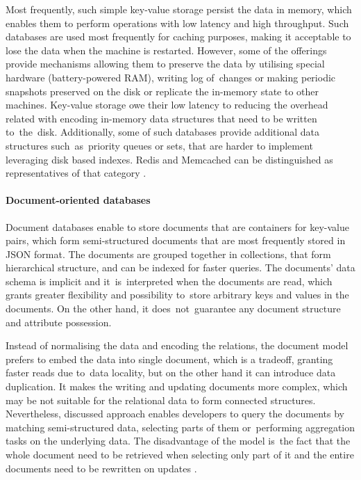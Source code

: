 Most frequently, such simple key-value storage persist the data in memory, which enables them to perform operations with low latency and high throughput. Such databases are used most frequently for caching purposes, making it acceptable to lose the data when the machine is restarted. However, some of the offerings provide mechanisms allowing them to preserve the data by utilising special hardware (battery-powered RAM), writing log of~changes or making periodic snapshots preserved on the disk or replicate the in-memory state to other machines. Key-value storage owe their low latency to reducing the overhead related with encoding in-memory data structures that need to be written to~the~disk. Additionally, some of such databases provide additional data structures such~as~priority queues or sets, that are harder to implement leveraging disk based indexes. Redis \cite{Redis} and Memcached \cite{Memcached} can be distinguished as representatives of that category \cite{DesignDataIntensiveApplications}. 

\paragraph{Document-oriented databases}

Document databases enable to store documents that are containers for key-value pairs, which form semi-structured documents that are most frequently stored in JSON format. The documents are grouped together in collections, that form hierarchical structure, and can be indexed for faster queries. The documents' data schema is implicit and it~is~interpreted when the documents are read, which grants greater flexibility and possibility to~store arbitrary keys and values in the documents. On the other hand, it does~not~guarantee any document structure and attribute possession.

Instead of normalising the data and encoding the relations, the document model prefers to embed the data into single document, which is a tradeoff, granting faster reads due to~data locality, but on the other hand it can introduce data duplication. It makes the writing and updating documents more complex, which may be not suitable for the relational data to form connected structures. Nevertheless, discussed approach enables developers to query the documents by matching semi-structured data, selecting parts of them or~performing aggregation tasks on the underlying data. 
The disadvantage of the model is~the fact that the whole document need to be retrieved when selecting only part of it and the entire documents need to be rewritten on updates \cite{DesignDataIntensiveApplications}.

